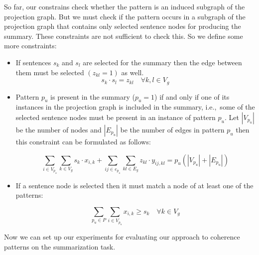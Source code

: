 So far, our constrains check whether the pattern is an induced subgraph of the projection graph. 
But we must check if the pattern occurs in a subgraph of the projection graph that contains only selected sentence nodes for producing the summary. 
These constraints are not sufficient to check this. 
So we define some more constraints:

\begin{itemize}

\item If sentences $s_{k}$ and $s_{l}$ are selected for the summary then the edge between them must be selected $(z_{kl}=1)$ as well.
\begin{equation}
 s_{k} \cdot s_{l}=z_{kl} \quad \forall k,l \in V_{g}
\end{equation}

\item Pattern $p_u$ is present in the summary ($p_u=1$) if and only if one of its instances in the projection graph is included in the summary, i.e.,\ some of the selected sentence nodes must be present in an instance of pattern $p_{u}$.
Let $|V_{p_{u}}|$ be the number of nodes and $|E_{p_u}|$ be the number of edges in pattern $p_{u}$ then this constraint can be formulated as follows:

\begin{equation}
\underset{i \in V_{p_u}}{\sum} \underset{k \in V_g}{\sum} s_k \cdot x_{i,k}+\underset{ij \in e_{p_u}}{\sum} \underset{kl \in E_g}{\sum} z_{kl} \cdot y_{ij,kl} = p_{u}(|V_{p_u}|+|E_{p_u}|)
\end{equation}

\item If a sentence node is selected then it must match a node of at least one of the patterns:

\begin{equation}
\sum_{p_{u} \in P} \sum_{i \in V_{p_{u}}} x_{i,k} \geq s_{k} \quad \forall k \in V_{g}
 \end{equation}
\end{itemize}

Now we can set up our experiments for evaluating our approach to coherence patterns on the summarization task. 

